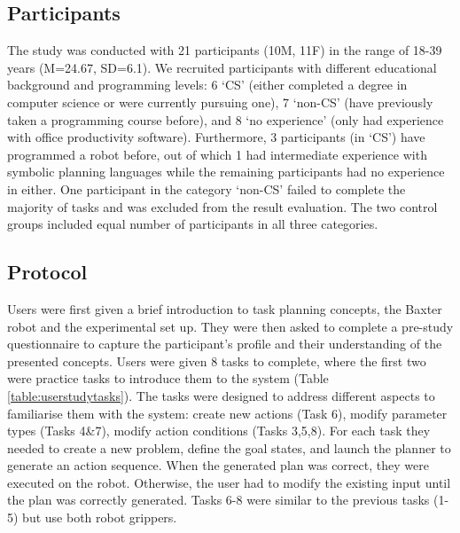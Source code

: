 \subsection{Participants}
The study was conducted with 21 participants (10M, 11F) in the range of 18-39 years (M=24.67, SD=6.1).
We recruited participants with different educational background and programming levels: 
6 `CS' (either completed a degree in computer science or were currently pursuing one),
7 `non-CS' (have previously taken a programming course before), 
and 8 `no experience' (only had experience with office productivity software).
Furthermore, 3 participants (in `CS') have programmed a robot before, out of which 1 had intermediate experience with symbolic planning languages while the remaining participants had no experience in either.
One participant in the category `non-CS' failed to complete the majority of tasks and was excluded from the result evaluation.
The two control groups included equal number of participants in all three categories.

\subsection{Protocol}
Users were first given a brief introduction to task planning concepts, the Baxter robot and the experimental set up.
They were then asked to complete a pre-study questionnaire to capture the participant's profile and their understanding of the presented concepts.
Users were given 8 tasks to complete, where the first two were practice tasks to introduce them to the system (Table \ref{table:userstudytasks}). 
The tasks were designed to address different aspects to familiarise them with the system:
create new actions (Task 6), modify parameter types (Tasks 4\&7), modify action conditions (Tasks 3,5,8).
For each task they needed to create a new problem, define the goal states, and launch the planner to generate an action sequence.
When the generated plan was correct, they were executed on the robot.
Otherwise, the user had to modify the existing input until the plan was correctly generated.
Tasks 6-8 were similar to the previous tasks (1-5) but use both robot grippers.

